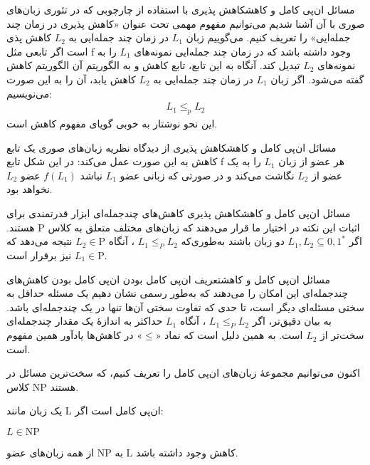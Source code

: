 \begin{itemframe-s}{مسائل ان‌پی کامل و کاهش}{کاهش پذیری}
\itm
با استفاده از چارچوبی که در تئوری زبان‌های صوری با آن آشنا شدیم می‌توانیم مفهوم مهمی تحت عنوان «کاهش پذیری در زمان چند جمله‌ایی»
را تعریف کنیم.
\itm
می‌گوییم زبان $ L_1 $ در زمان چند جمله‌ایی به $ L_2 $  کاهش پذی است  اگر تابعی مثل f وجود داشته باشد که در زمان چند جمله‌ایی نمونه‌های $ L_1 $ را به نمونه‌های $ L_2 $ تبدیل کند. آنگاه به این تابع، تابع کاهش
و به الگوریتم آن الگوریتم کاهش
گفته می‌شود.
\itm
اگر زبان $ L_1 $ در زمان چند جمله‌ایی به $ L_2 $ کاهش یابد، آن را به این صورت می‌نویسیم:
\begin{align*}
L_1 \leq_p L_2
\end{align*}
 این نحو نوشتار به خوبی گویای مفهوم کاهش است.
\end{itemframe-s}

\begin{itemframe-s}{مسائل ان‌پی کامل و کاهش}{کاهش پذیری}
\itm
از دیدگاه نظریه زبان‌های صوری یک تابع کاهش به این صورت عمل می‌کند:
 \itm
در این شکل تابع f هر عضو از زبان  $ L_1 $ را به یک عضو از $ L_2 $ نگاشت می‌کند و در صورتی که زبانی عضو  $ L_1 $  نباشد $ f(L_1)$ عضو $ L_2 $ نخواهد بود.
\end{itemframe-s}

\begin{itemframe-s}{مسائل ان‌پی کامل و کاهش}{کاهش پذیری}
\itm
کاهش‌های چندجمله‌ای ابزار قدرتمندی برای اثبات این نکته در اختیار ما قرار می‌دهند که زبان‌های مختلف متعلق به کلاس
 $\mathrm{P}$
هستند.
\itm
اگر
$L_1, L_2 \subseteq {0,1}^*$
دو زبان باشند به‌طوری‌که
$L_1 \leq_P L_2$
، آنگاه
$L_2 \in \mathrm{P}$
 نتیجه می‌دهد که
$L_1 \in \mathrm{P}$
نیز برقرار است.

\end{itemframe-s}

\begin{itemframe-s}{مسائل ان‌پی کامل و کاهش}{تعریف ان‌پی کامل بودن}
\itm
ان‌پی کامل بودن کاهش‌های چندجمله‌ای این امکان را می‌دهند که به‌طور رسمی نشان دهیم یک مسئله حداقل به سختی مسئله‌ای دیگر است، تا حدی که تفاوت سختی آن‌ها تنها در یک چندجمله‌ای باشد.
\itm
 به بیان دقیق‌تر، اگر
 $L_1 \leq_P L_2$
، آنگاه
$L_1$
 حداکثر به اندازهٔ یک مقدار چندجمله‌ای سخت‌تر از
$L_2$
 است. به همین دلیل است که نماد «$\leq$» در کاهش‌ها یادآور همین مفهوم است.

\itm

اکنون می‌توانیم مجموعهٔ زبان‌های ان‌پی کامل را تعریف کنیم، که سخت‌ترین مسائل در کلاس NP هستند.

یک زبان مانند L ان‌پی کامل است اگر:
\item[1]
$L \in \mathrm{NP}$
\item[2]
از همه زبان‌های عضو NP  به L کاهش وجود داشته باشد.

\end{itemframe-s}


